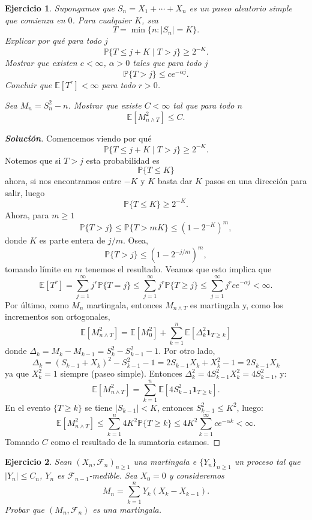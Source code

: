 \documentclass[11pt]{article}
\theoremstyle{ejstyle}
\newtheorem{ejercicio}{Ejercicio}
\newenvironment{solucion}
{\begin{proof}[{\bfseries\color{deepindigo} Solución}]}
	{\end{proof}}
\begin{document}
	\begin{ejercicio}
		Supongamos que $S_n = X_1 + \cdots + X_n$ es un paseo aleatorio simple que comienza en $0$. 
		Para cualquier $K$, sea
		$$T = \min\{n : |S_n| = K\}.$$
		Explicar por qué para todo $j$
		$$\mathbb{P}\{T \leq j + K \mid T > j\} \geq 2^{-K}.$$
		Mostrar que existen $c < \infty$, $\alpha > 0$ tales que para todo $j$
		$$\mathbb{P}\{T > j\} \leq c e^{-\alpha j}.$$
		Concluir que $\mathbb{E}[T^r] < \infty$ para todo $r > 0$.
		
		Sea $M_n = S_n^2 - n$. Mostrar que existe $C < \infty$ tal que para todo $n$
		$$\mathbb{E}\left[M_{n \wedge T}^2\right] \leq C.$$
	\end{ejercicio}
	
	\begin{solucion}
		Comencemos viendo por qué
		$$\mathbb{P}\{T \leq j + K \mid T > j\} \geq 2^{-K}.$$
		Notemos que si $T > j$ esta probabilidad es
		$$\mathbb{P}\{T \leq K \}$$
		ahora, si nos encontramos entre $-K$ y $K$ basta dar $K$ pasos en una dirección para salir, luego
		$$\mathbb{P}\{T \leq K \} \geq 2^{-K}.$$ 
		Ahora, para $m \geq 1$
		$$\mathbb{P}\{T > j\} \leq \mathbb{P}\{T > mK\} \leq (1 - 2^{-K})^{m},$$
		donde $K$ es parte entera de $j/m$. Osea,
		$$\mathbb{P}\{T > j\} \leq (1 - 2^{-j/m})^{m},$$
		tomando límite en $m$ tenemos el resultado. Veamos que esto implica que
		$$\mathbb{E}[T^r] = \sum_{j=1}^\infty j^r \mathbb{P}\{T = j\} \leq \sum_{j=1}^\infty j^r \mathbb{P}\{T \geq j\} \leq \sum_{j=1}^\infty j^r c e^{-\alpha j} < \infty.$$
		Por último, como $M_n$ martingala, entonces $M_{n\wedge T}$ es martingala y, como los incrementos son ortogonales,
		$$\mathbb{E}[M_{n\wedge T}^2] = \mathbb{E}[M_0^2] + \sum_{k=1}^n \mathbb{E}[\Delta_k^2 \mathbf{1}_{T \geq k}]$$
		donde $\Delta_k = M_k - M_{k-1} = S_k^2 - S_{k-1}^2 - 1$. Por otro lado,
		$$\Delta_k = (S_{k-1} + X_k)^2 - S_{k-1}^2 - 1 = 2S_{k-1}X_k + X_k^2 - 1 = 2S_{k-1}X_k$$
		ya que $X_k^2 = 1$ siempre (paseo simple). Entonces $\Delta_k^2 = 4S_{k-1}^2 X_k^2 = 4S_{k-1}^2$, y:
		$$\mathbb{E}[M_{n\wedge T}^2] = \sum_{k=1}^n \mathbb{E}[4S_{k-1}^2 \mathbf{1}_{T \geq k}].$$
		En el evento $\{T \geq k\}$ se tiene $|S_{k-1}| < K$, entonces $S_{k-1}^2 \leq K^2$, luego:
		$$\mathbb{E}[M_{n\wedge T}^2] \leq \sum_{k=1}^n 4K^2 \mathbb{P}\{T \geq k\} \leq 4K^2 \sum_{k=1}^\infty ce^{-\alpha k} < \infty.$$
		Tomando $C$ como el resultado de la sumatoria estamos.
		
		
	\end{solucion}

	\begin{ejercicio}
			Sean $(X_n, \mathcal{F}_n)_{n \geq 1}$ una martingala e $\{Y_n\}_{n \geq 1}$ un proceso tal que 
			$|Y_n| \leq C_n$, $Y_n$ es $\mathcal{F}_{n-1}$-medible. Sea $X_0 = 0$ y consideremos
			$$M_n = \sum_{k=1}^n Y_k(X_k - X_{k-1}).$$
			Probar que $(M_n, \mathcal{F}_n)$ es una martingala.
	\end{ejercicio}
	
\end{document}
